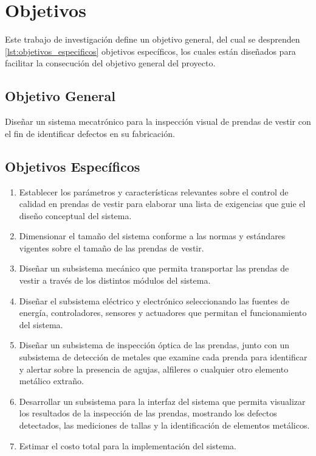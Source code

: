 \section{Objetivos}

Este trabajo de investigación define un objetivo general, del cual se desprenden \ref{lst:objetivos_especificos} objetivos específicos, los cuales están diseñados para facilitar la consecución del objetivo general del proyecto.

\subsection{Objetivo General}

Diseñar un sistema mecatrónico para la inspección visual de prendas de vestir con el fin de identificar defectos en su fabricación.

\subsection{Objetivos Específicos}

\begin{enumerate}
	\setlength\itemsep{-0.5em}
	\item Establecer los parámetros y características relevantes sobre el control de calidad en prendas de vestir para elaborar una lista de exigencias que guie el diseño conceptual del sistema.
	
	\item Dimensionar el tamaño del sistema conforme a las normas y estándares vigentes sobre el tamaño de las prendas de vestir.
	
	\item Diseñar un subsistema mecánico que permita transportar las prendas de vestir a través de los distintos módulos del sistema.
	
	\item Diseñar el subsistema eléctrico y electrónico seleccionando las fuentes de energía, controladores, sensores y actuadores que permitan el funcionamiento del sistema.
	
	\item Diseñar un subsistema de inspección óptica de las prendas, junto con un subsistema de detección de metales que examine cada prenda para identificar y alertar sobre la presencia de agujas, alfileres o cualquier otro elemento metálico extraño.
	
	\item Desarrollar un subsistema para la interfaz del sistema que permita visualizar los resultados de la inspección de las prendas, mostrando los defectos detectados, las mediciones de tallas y la identificación de elementos metálicos.
	
	\item Estimar el costo total para la implementación del sistema.
	
	\label{lst:objetivos_especificos}
\end{enumerate}

